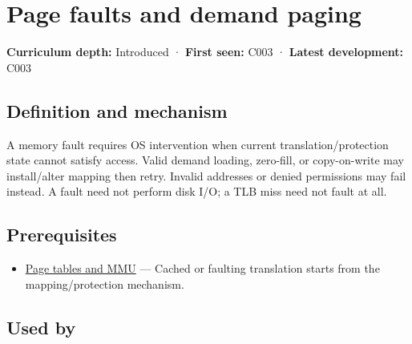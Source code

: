 \hypertarget{appendix-cc0909a7ef14}{}\label{referencestart:appendix-cc0909a7ef14}
\section{Page faults and demand paging}\label{appendix-cc0909a7ef14-page-faults-and-demand-paging}

\hypertarget{appendix-cc0909a7ef14-page-faults-and-demand-paging}{}

\textbf{Curriculum depth:} Introduced · \textbf{First seen:} C003 · \textbf{Latest development:} C003

\begin{allmightroledefinition}

\subsection{Definition and mechanism}\label{appendix-cc0909a7ef14-definition-and-mechanism}

\hypertarget{appendix-cc0909a7ef14-definition-and-mechanism}{}

A memory fault requires OS intervention when current translation/protection state cannot satisfy access. Valid demand loading, zero-fill, or copy-on-write may install/alter mapping then retry. Invalid addresses or denied permissions may fail instead. A fault need not perform disk I/O; a TLB miss need not fault at all.

\end{allmightroledefinition}

\subsection{Prerequisites}\label{appendix-cc0909a7ef14-prerequisites}

\hypertarget{appendix-cc0909a7ef14-prerequisites}{}

\begin{itemize}
\tightlist
\item
  \hyperref[appendix-01e5905165c4]{Page tables and MMU} --- Cached or faulting translation starts from the mapping/protection mechanism.
\end{itemize}

\subsection{Used by}\label{appendix-cc0909a7ef14-used-by}

\hypertarget{appendix-cc0909a7ef14-used-by}{}

